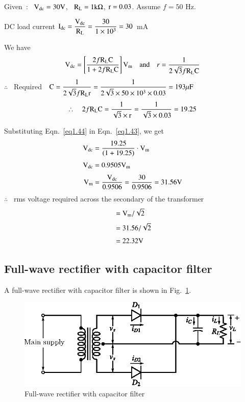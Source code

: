 \begin{solution}
Given~:~ $\textrm{V}_{\text{dc}}=30\textrm{V}$, \ $\textrm{R}_{\textrm{L}}=1\textrm{k}\Omega$, $\textrm{r}=0.03$. Assume $f=50$ Hz.

DC load current $\textrm{I}_{\text{dc}}=\dfrac{\textrm{V}_{\text{dc}}}{\textrm{R}_{\textrm{L}}}=\dfrac{30}{1\times 10^{3}}=30$~mA

We have
\begin{equation}
\textrm{V}_{\text{dc}}=\left[\frac{2f\textrm{R}_{\textrm{L}}\textrm{C}}{1+2f\textrm{R}_{\textrm{L}}\textrm{C}}\right]\textrm{V}_{\textrm{m}}\quad\text{and}\quad r=\dfrac{1}{2\sqrt{3}f\textrm{R}_{\textrm{L}}\textrm{C}}\label{eq1.43}
\end{equation}
$\therefore$~ Required \ $\rmC=\dfrac{1}{2\sqrt{3}f\rmR_{\rmL}\rmr}=\dfrac{1}{2\sqrt{3}\times 50\time 1\times 10^{3}\times 0.03}=193\mu\rmF$
\begin{equation}
\therefore\quad 2f\textrm{R}_{\textrm{L}}\textrm{C}=\dfrac{1}{\sqrt{3}\times \textrm{r}}=\dfrac{1}{\sqrt{3}\times 0.03}=19.25\label{eq1.44}
\end{equation}

Substituting Eqn.~\eqref{eq1.44} in Eqn.~\eqref{eq1.43}, we get
\begin{align*}
\textrm{V}_{\text{dc}} &= \frac{19.25}{(1+19.25)}\cdot \textrm{V}_{\textrm{m}}\\[3pt]
\textrm{V}_{\text{dc}} &= 0.9505\textrm{V}_{\textrm{m}}\\[3pt]
\textrm{V}_{\textrm{m}} &= \frac{\textrm{V}_{\text{dc}}}{0.9506}=\dfrac{30}{0.9506}=31.56\textrm{V}
\end{align*}
$\therefore$~ rms voltage required across the secondary of the transformer
\begin{align*}
&= \textrm{V}_{\textrm{m}}/\sqrt{2}\\[3pt]
&= 31.56/\sqrt{2}\\[3pt]
&= 22.32\textrm{V}
\end{align*}
\end{solution}


\subsection{Full-wave rectifier with capacitor filter}\label{sec1.11.2}

A full-wave rectifier with capacitor filter is shown in Fig.~\ref{fig1.40}.
\begin{figure}[H]
\centering
\includegraphics{chap1/fig1.40.eps}
\caption{Full-wave rectifier with capacitor filter}\label{fig1.40}
\end{figure}

